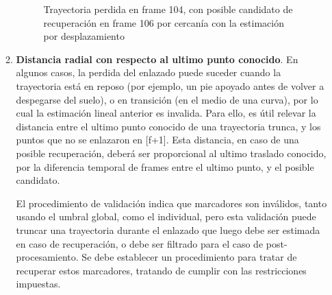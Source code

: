 \begin{itemize}
\begin{enumerate}
\begin{figure}[H]
\caption{Trayectoria perdida en frame 104, con posible candidato de recuperación en frame 106 por cercanía con la estimación por desplazamiento}
\label{inventario_trayectoria_direccional}
\end{figure} 
  
  \item \textbf{Distancia radial con respecto al ultimo punto conocido}. En algunos casos, la perdida del enlazado puede suceder cuando la trayectoria está en reposo (por ejemplo, un pie apoyado antes de volver a despegarse del suelo), o en transición (en el medio de una curva), por lo cual la estimación lineal anterior es invalida. Para ello, es útil relevar la distancia entre el ultimo punto conocido de una trayectoria trunca, y los puntos que no se enlazaron en [f+1]. Esta distancia, en caso de una posible recuperación, deberá ser proporcional al ultimo traslado conocido, por la diferencia temporal de frames entre el ultimo punto, y el posible candidato.
 
El procedimiento de validación indica que marcadores son inválidos, tanto usando el umbral global, como el individual, pero esta validación puede truncar una trayectoria durante el enlazado que luego debe ser estimada en caso de recuperación, o debe ser filtrado para el caso de post-procesamiento. Se debe establecer un procedimiento para tratar de recuperar estos marcadores, tratando de cumplir con las restricciones impuestas.
 
  
\end{enumerate} 

\end{itemize}

